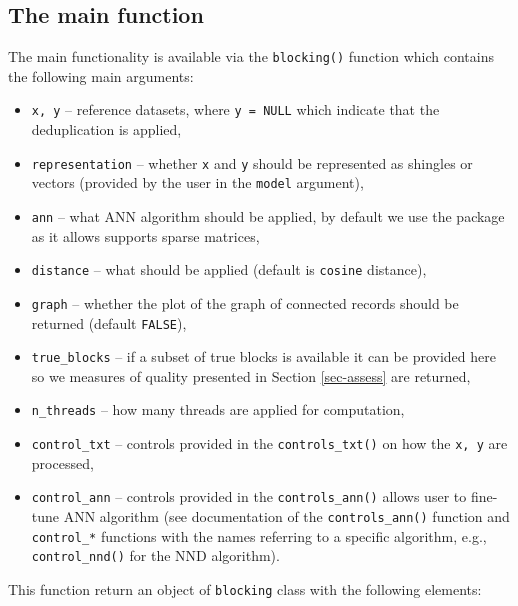 \subsection{The main function}\label{the-main-function}

The main functionality is available via the \texttt{blocking()} function which contains the following main arguments:

\begin{itemize}
\tightlist
\item
  \texttt{x,\ y} -- reference datasets, where \texttt{y\ =\ NULL} which indicate that the deduplication is applied,
\item
  \texttt{representation} -- whether \texttt{x} and \texttt{y} should be represented as shingles or vectors (provided by the user in the \texttt{model} argument),
\item
  \texttt{ann} -- what ANN algorithm should be applied, by default we use the  package as it allows supports sparse matrices,
\item
  \texttt{distance} -- what should be applied (default is \texttt{cosine} distance),
\item
  \texttt{graph} -- whether the plot of the graph of connected records should be returned (default \texttt{FALSE}),
\item
  \texttt{true\_blocks} -- if a subset of true blocks is available it can be provided here so we measures of quality presented in Section \ref{sec-assess} are returned,
\item
  \texttt{n\_threads} -- how many threads are applied for computation,
\item
  \texttt{control\_txt} -- controls provided in the \texttt{controls\_txt()} on how the \texttt{x,\ y} are processed,
\item
  \texttt{control\_ann} -- controls provided in the \texttt{controls\_ann()} allows user to fine-tune ANN algorithm (see documentation of the \texttt{controls\_ann()} function and \texttt{control\_*} functions with the names referring to a specific algorithm, e.g., \texttt{control\_nnd()} for the NND algorithm).
\end{itemize}

This function return an object of \texttt{blocking} class with the following elements:

